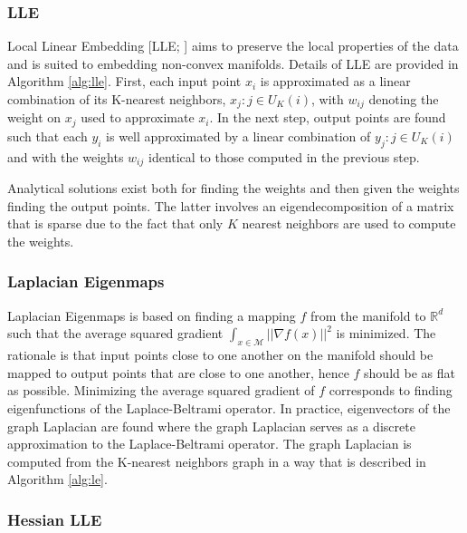 \documentclass[11pt,a4paper,]{article}
\begin{document}
\hypertarget{lle}{%
\subsubsection*{LLE}\label{lle}}

Local Linear Embedding {[}LLE; \textcite{Roweis2000-ni}{]} aims to preserve the local properties of the data and is suited to embedding non-convex manifolds. Details of LLE are provided in Algorithm \ref{alg:lle}. First, each input point \(x_i\) is approximated as a linear combination of its K-nearest neighbors, \(x_j:j\in U_K(i)\), with \(w_{ij}\) denoting the weight on \(x_j\) used to approximate \(x_i\). In the next step, output points are found such that each \(y_i\) is well approximated by a linear combination of \(y_j:j\in U_K(i)\) and with the weights \(w_{ij}\) identical to those computed in the previous step.

Analytical solutions exist both for finding the weights and then given the weights finding the output points. The latter involves an eigendecomposition of a matrix that is sparse due to the fact that only \(K\) nearest neighbors are used to compute the weights.

\hypertarget{laplacian-eigenmaps}{%
\subsubsection*{Laplacian Eigenmaps}\label{laplacian-eigenmaps}}

Laplacian Eigenmaps \autocite{Belkin2003-kz} is based on finding a mapping \(f\) from the manifold to \(\mathbb{R}^d\) such that the average squared gradient \(\int_{x\in\mathcal{M}}||\nabla f(x)||^2\) is minimized. The rationale is that input points close to one another on the manifold should be mapped to output points that are close to one another, hence \(f\) should be as flat as possible. Minimizing the average squared gradient of \(f\) corresponds to finding eigenfunctions of the Laplace-Beltrami operator. In practice, eigenvectors of the graph Laplacian are found where the graph Laplacian serves as a discrete approximation to the Laplace-Beltrami operator. The graph Laplacian is computed from the K-nearest neighbors graph in a way that is described in Algorithm \ref{alg:le}.

\hypertarget{hessian-lle}{%
\subsubsection*{Hessian LLE}\label{hessian-lle}}
\end{document}
